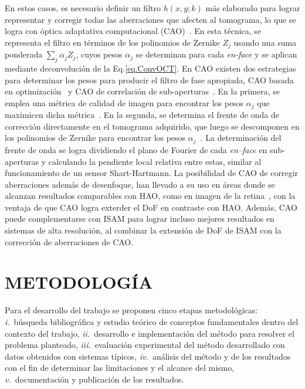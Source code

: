 \documentclass[letter, 12 pt]{article}
\begin{document}
En estos casos, es necesario definir un filtro $h(x,y;k)$ más elaborado para lograr representar y corregir todas las aberraciones que afecten al tomograma, lo que se logra con óptica adaptativa computacional (CAO)~\cite{adie2012}. En esta técnica, se representa el filtro en términos de los polinomios de Zernike $Z_j$ usando una suma ponderada $\sum_j\alpha_jZ_j$, cuyos pesos $\alpha_j$ se determinan para cada \textit{en-face} y se aplican mediante deconvolución de la Eq.\eqref{eq.ConvOCT}. En CAO existen dos estrategias para determinar los pesos para producir el filtro de fase apropiada, CAO basada en optimización~\cite{adie2012, pande2016, hillmann2016} y CAO de correlación de sub-aperturas~\cite{kumar2013}. En la primera, se emplea una métrica de calidad de imagen para encontrar los pesos $\alpha_j$ que maximicen dicha métrica~\cite{adie2012}. En la segunda, se determina el frente de onda de corrección directamente en el tomograma adquirido, que luego se descomponen en los polinomios de Zernike para encontrar los pesos $\alpha_j$~\cite{kumar2013}. La determinación del frente de onda se logra dividiendo el plano de Fourier de cada \textit{en--face} en sub-aperturas y calculando la pendiente local relativa entre estas, similar al funcionamiento de un sensor Shart-Hartmann. La posibilidad de CAO de corregir aberraciones además de desenfoque, han llevado a su uso en áreas donde se alcanzan resultados comparables con HAO, como en imagen de la retina~\cite{hillmann2016, Ginner2017_Noniterative}, con la ventaja de que CAO logra exterder el DoF en contraste con HAO. Además, CAO puede complementarse con ISAM para lograr incluso mejores resultados en sistemas de alta resolución, al combinar la extensión de DoF de ISAM con la corrección de aberraciones de CAO.


\section{METODOLOGÍA} \label{sec:metodología}
Para el desarrollo del trabajo se proponen cinco etapas metodológicas: \textit{i.}~búsqueda bibliográfica y estudio teórico de conceptos fundamentales dentro del contexto del trabajo, \textit{ii.}~desarrollo e implementación del método para resolver el problema planteado, \textit{iii.}~evaluación experimental del método desarrollado con datos obtenidos con sistemas típicos, \textit{iv.}~análisis del método y de los resultados con el fin de determinar las limitaciones y el alcance del mismo, \textit{v.}~documentación y publicación de los resultados.
\end{document}

